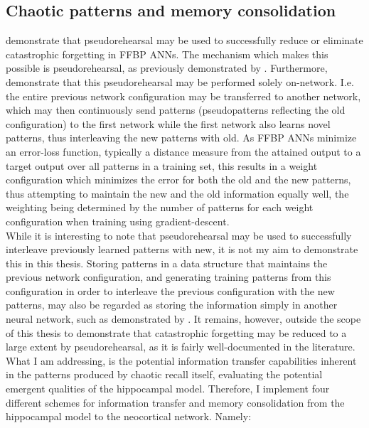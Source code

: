 
\subsection{Chaotic patterns and memory consolidation}\label{subsection:hpc-pseudopatterns}

\cite{Ans1997} demonstrate that pseudorehearsal may be used to successfully reduce or eliminate catastrophic forgetting in FFBP ANNs. The mechanism which makes this possible is pseudorehearsal, as previously demonstrated by \cite{Robins1995}. Furthermore, \cite{Ans1997} demonstrate that this pseudorehearsal may be performed solely on-network. I.e. the entire previous network configuration may be transferred to another network, which may then continuously send patterns (pseudopatterns reflecting the old configuration) to the first network while the first network also learns novel patterns, thus interleaving the new patterns with old. As FFBP ANNs minimize an error-loss function, typically a distance measure from the attained output to a target output over all patterns in a training set, this results in a weight configuration which minimizes the error for both the old and the new patterns, thus attempting to maintain the new and the old information equally well, the weighting being determined by the number of patterns for each weight configuration when training using gradient-descent.
\\

While it is interesting to note that pseudorehearsal may be used to successfully interleave previously learned patterns with new, it is not my aim to demonstrate this in this thesis.
Storing patterns in a data structure that maintains the previous network configuration, and generating training patterns from this configuration in order to interleave the previous configuration with the new patterns, may also be regarded as storing the information simply in another neural network, such as demonstrated by \cite{French1997}. It remains, however, outside the scope of this thesis to demonstrate that catastrophic forgetting may be reduced to a large extent by pseudorehearsal, as it is fairly well-documented in the literature. 
What I am addressing, is the potential information transfer capabilities inherent in the patterns produced by chaotic recall itself, evaluating the potential emergent qualities of the hippocampal model. Therefore, I implement four different schemes for information transfer and memory consolidation from the hippocampal model to the neocortical network. Namely:

